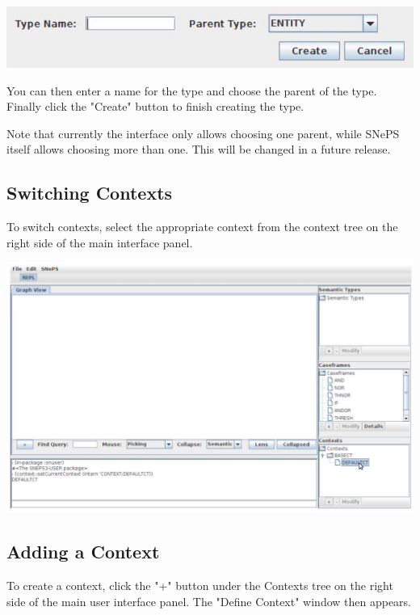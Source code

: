 \documentclass[10pt]{article}
\begin{document}
\begin{center}
\includegraphics[max width=\textwidth]{2023_06_06_402e2c8ca4c84733095bg-3}
\end{center}

You can then enter a name for the type and choose the parent of the type. Finally click the "Create" button to finish creating the type.

Note that currently the interface only allows choosing one parent, while SNePS itself allows choosing more than one. This will be changed in a future release.

\subsection{Switching Contexts}
To switch contexts, select the appropriate context from the context tree on the right side of the main interface panel.

\begin{center}
\includegraphics[max width=\textwidth]{2023_06_06_402e2c8ca4c84733095bg-3(1)}
\end{center}

\subsection{Adding a Context}
To create a context, click the "+" button under the Contexts tree on the right side of the main user interface panel. The "Define Context" window then appears.
\end{document}
